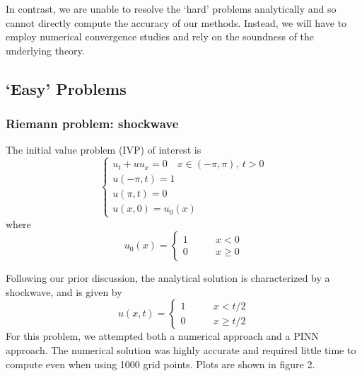 \documentclass{myproject}
\begin{document}
In contrast, we are unable to resolve the `hard' problems analytically and so cannot directly compute the accuracy of our methods. Instead, we will have to employ numerical convergence studies and rely on the soundness of the underlying theory.

\subsection{`Easy' Problems}

\subsubsection{Riemann problem: shockwave}

The initial value problem (IVP) of interest is
\begin{equation}\label{IVP:shock}
    \begin{cases}
        u_t + uu_x = 0 \quad x \in (-\pi,\pi), \: t > 0 \\
        u(-\pi,t) = 1 \\
        u(\pi,t) = 0 \\
        u(x,0) = u_0(x)
    \end{cases} 
\end{equation}
where 
\begin{equation}
    u_0(x) = \begin{cases}
        1 \qquad & x < 0 \\
        0 \qquad & x \geq 0
    \end{cases}
\end{equation}

Following our prior discussion, the analytical solution is characterized by a shockwave, and is given by
\begin{equation}
    u(x,t) = \begin{cases}
        1 \qquad & x < t/2 \\
        0 \qquad & x \geq t/2
    \end{cases}
\end{equation}
For this problem, we attempted both a numerical approach and a PINN approach. The numerical solution was highly accurate and required little time to compute even when using 1000 grid points. Plots are shown in figure 2.
\end{document}
